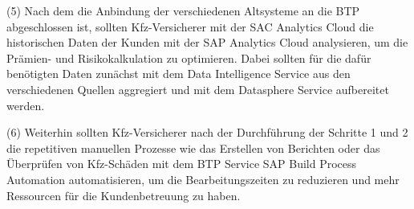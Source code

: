 (5) Nach dem die Anbindung der verschiedenen Altsysteme an die BTP abgeschlossen ist, sollten Kfz-Versicherer mit der SAC Analytics Cloud die historischen Daten der Kunden mit der SAP Analytics Cloud analysieren, um die Prämien- und Risikokalkulation zu optimieren. Dabei sollten für die dafür benötigten Daten zunächst mit dem Data Intelligence Service aus den verschiedenen Quellen aggregiert und mit dem Datasphere Service aufbereitet werden.

(6) Weiterhin sollten Kfz-Versicherer nach der Durchführung der Schritte 1 und 2 die repetitiven manuellen Prozesse wie das Erstellen von Berichten oder das Überprüfen von Kfz-Schäden mit dem BTP Service SAP Build Process Automation automatisieren, um die Bearbeitungszeiten zu reduzieren und mehr Ressourcen für die Kundenbetreuung zu haben.







